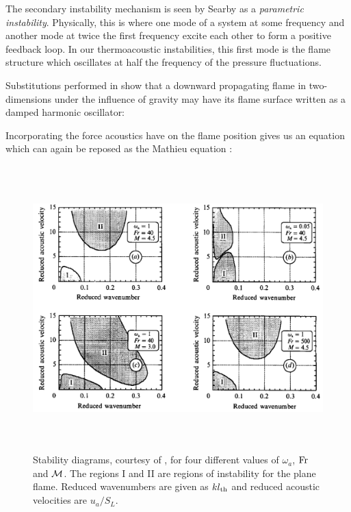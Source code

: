 








The secondary instability mechanism is seen by Searby \cite{searby1992AcousticInstabilityPremixed} as a \emph{parametric instability}. Physically, this is where one mode of a system at some frequency and another mode at twice the first frequency excite each other to form a positive feedback loop. In our thermoacoustic instabilities, this first mode is the flame structure which oscillates at half the frequency of the pressure fluctuations.

Substitutions performed in \cite{searby1986WeaklyTurbulentWrinkled} show that a downward propagating flame in two-dimensions under the influence of gravity may have its flame surface written as a damped harmonic oscillator:

Incorporating the force acoustics have on the flame position gives us an equation which can again be reposed as the Mathieu equation \cite{searby1991ParametricAcousticInstability}:


\begin{figure}[t]
\centering
\includegraphics[height=11cm]{assets/graphs/thermoacoustic-stability.png}
\caption{Stability diagrams, courtesy of \cite{searby1991ParametricAcousticInstability}, for four different values of $ω_a$, $\Fr$ and $\Mk$. The regions I and II are regions of instability for the plane flame. Reduced wavenumbers are given as $k l_\rm{th}$ and reduced acoustic velocities are $u_a / S_L$.}
\label{fig:ta-stab}
\end{figure}

